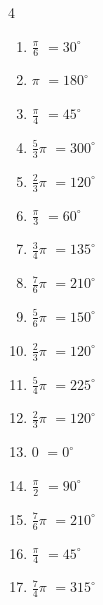 \begin{multicols}{4}
\begin{enumerate}
  \item $\displaystyle \frac{\pi}{6}$
        $\displaystyle =30^{\circ}$

  \item $\displaystyle \pi$
        $\displaystyle =180^{\circ}$

  \item $\displaystyle \frac{\pi}{4}$
        $\displaystyle =45^{\circ}$

  \item $\displaystyle \frac{5}{3}\pi$
        $\displaystyle =300^{\circ}$

  \item $\displaystyle \frac{2}{3}\pi$
        $\displaystyle =120^{\circ}$

  \item $\displaystyle \frac{\pi}{3}$
        $\displaystyle =60^{\circ}$

  \item $\displaystyle \frac{3}{4}\pi$
        $\displaystyle =135^{\circ}$

  \item $\displaystyle \frac{7}{6}\pi$
        $\displaystyle =210^{\circ}$

  \item $\displaystyle \frac{5}{6}\pi$
        $\displaystyle =150^{\circ}$

  \item $\displaystyle \frac{2}{3}\pi$
        $\displaystyle =120^{\circ}$

  \item $\displaystyle \frac{5}{4}\pi$
        $\displaystyle =225^{\circ}$

  \item $\displaystyle \frac{2}{3}\pi$
        $\displaystyle =120^{\circ}$

  \item $\displaystyle 0$
        $\displaystyle =0^{\circ}$

  \item $\displaystyle \frac{\pi}{2}$
        $\displaystyle =90^{\circ}$

  \item $\displaystyle \frac{7}{6}\pi$
        $\displaystyle =210^{\circ}$

\columnbreak %

  \item $\displaystyle \frac{\pi}{4}$
        $\displaystyle =45^{\circ}$

  \item $\displaystyle \frac{7}{4}\pi$
        $\displaystyle =315^{\circ}$


\end{enumerate}
\end{multicols}
